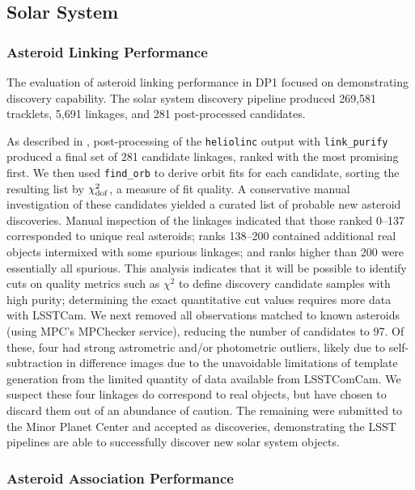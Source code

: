 \subsection{Solar System}
\label{sec:performance:solsys}

\subsubsection{Asteroid Linking Performance}

The evaluation of asteroid linking performance in DP1 focused on demonstrating discovery capability.
The solar system discovery \gls{pipeline} produced 269,581 tracklets, 5,691 linkages, and 281 post-processed candidates.

As described in , post-processing of the {\tt heliolinc} output with {\tt link_purify} produced a final set of 281 candidate linkages, ranked with the most promising first. 
We then used {\tt find_orb} \citep{findorb} to derive orbit fits for each candidate, sorting the resulting list by $\chi_{\rm dof}^2$, a measure of fit quality. 
A conservative manual investigation of these candidates yielded a curated list of \nnewasteroiddiscoveries probable new asteroid discoveries.
Manual inspection of the linkages indicated that those ranked 0--137 corresponded to unique real asteroids; ranks 138--200 contained additional real objects intermixed with some spurious linkages; and ranks higher than 200 were essentially all spurious.
This analysis indicates that it will be possible to identify cuts on quality metrics such as $\chi^2$ to define discovery candidate samples with high purity; determining the exact quantitative cut values requires more data with \gls{LSSTCam}.
We next removed all observations matched to known asteroids (using \gls{MPC}'s MPChecker service), reducing the number of candidates to 97.
Of these, four had strong astrometric and/or photometric outliers, likely due to self-subtraction in difference images due to the unavoidable limitations of template generation from the limited quantity of data available from  \gls{LSSTComCam}.
We suspect these four linkages do correspond to real objects, but have chosen to discard them out of an abundance of caution.
The remaining \nnewasteroiddiscoveries were submitted to the Minor Planet Center and accepted as  discoveries, demonstrating the \gls{LSST} pipelines are able to successfully discover new solar system objects.

\subsubsection{Asteroid Association Performance}
\label{ssec:asteroid_association}

